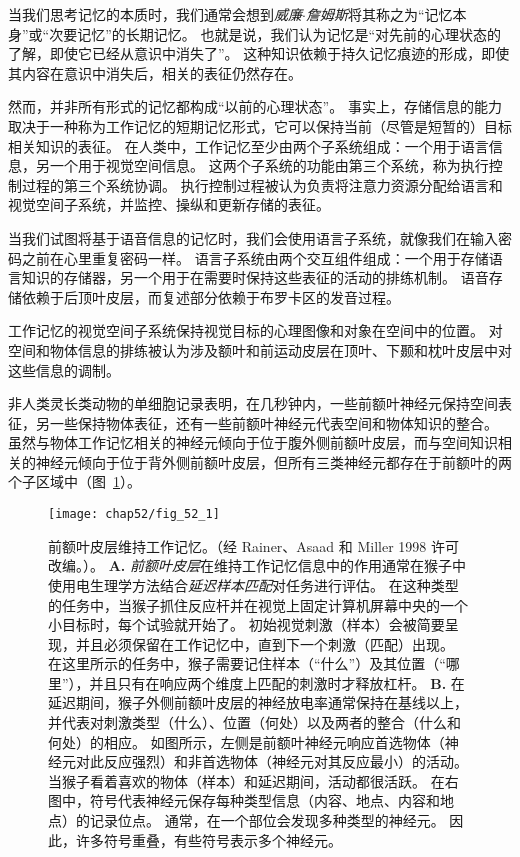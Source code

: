 当我们思考记忆的本质时，我们通常会想到\textit{威廉$\cdot$詹姆斯}将其称之为“记忆本身”或“次要记忆”的长期记忆。
也就是说，我们认为记忆是“对先前的心理状态的了解，即使它已经从意识中消失了”。
这种知识依赖于持久记忆痕迹的形成，即使其内容在意识中消失后，相关的表征仍然存在。


然而，并非所有形式的记忆都构成“以前的心理状态”。
事实上，存储信息的能力取决于一种称为工作记忆的短期记忆形式，它可以保持当前（尽管是短暂的）目标相关知识的表征。
在人类中，工作记忆至少由两个子系统组成：一个用于语言信息，另一个用于视觉空间信息。
这两个子系统的功能由第三个系统，称为执行控制过程的第三个系统协调。
执行控制过程被认为负责将注意力资源分配给语言和视觉空间子系统，并监控、操纵和更新存储的表征。


当我们试图将基于语音信息的记忆时，我们会使用语言子系统，就像我们在输入密码之前在心里重复密码一样。
语言子系统由两个交互组件组成：一个用于存储语言知识的存储器，另一个用于在需要时保持这些表征的活动的排练机制。
语音存储依赖于后顶叶皮层，而复述部分依赖于布罗卡区的发音过程。


工作记忆的视觉空间子系统保持视觉目标的心理图像和对象在空间中的位置。
对空间和物体信息的排练被认为涉及额叶和前运动皮层在顶叶、下颞和枕叶皮层中对这些信息的调制。


非人类灵长类动物的单细胞记录表明，在几秒钟内，一些前额叶神经元保持空间表征，另一些保持物体表征，还有一些前额叶神经元代表空间和物体知识的整合。
虽然与物体工作记忆相关的神经元倾向于位于腹外侧前额叶皮层，而与空间知识相关的神经元倾向于位于背外侧前额叶皮层，但所有三类神经元都存在于前额叶的两个子区域中（图~\ref{fig:52_1}）。


\begin{figure}[htbp]
	\centering
	\texttt{[image: chap52/fig\_52\_1]}
	\caption{前额叶皮层维持工作记忆。（经 Rainer、Asaad 和 Miller 1998 许可改编。）\cite{rainer1998memory}。
		\textbf{A.} \textit{前额叶皮层}在维持工作记忆信息中的作用通常在猴子中使用电生理学方法结合\textit{延迟样本匹配}对任务进行评估。
		在这种类型的任务中，当猴子抓住反应杆并在视觉上固定计算机屏幕中央的一个小目标时，每个试验就开始了。
		初始视觉刺激（样本）会被简要呈现，并且必须保留在工作记忆中，直到下一个刺激（匹配）出现。
		在这里所示的任务中，猴子需要记住样本（“什么”）及其位置（“哪里”），并且只有在响应两个维度上匹配的刺激时才释放杠杆。
		\textbf{B.} 在延迟期间，猴子外侧前额叶皮层的神经放电率通常保持在基线以上，并代表对刺激类型（什么）、位置（何处）以及两者的整合（什么和何处）的相应。
		如图所示，左侧是前额叶神经元响应首选物体（神经元对此反应强烈）和非首选物体（神经元对其反应最小）的活动。
		当猴子看着喜欢的物体（样本）和延迟期间，活动都很活跃。
		在右图中，符号代表神经元保存每种类型信息（内容、地点、内容和地点）的记录位点。
		通常，在一个部位会发现多种类型的神经元。
		因此，许多符号重叠，有些符号表示多个神经元。}
	\label{fig:52_1}
\end{figure}


